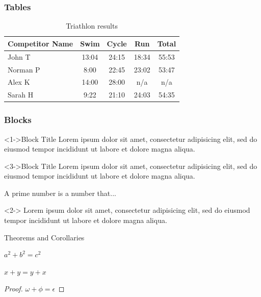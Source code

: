 \documentclass{beamer}
\begin{document}
\begin{frame}
	\frametitle{Tables}
	\begin{table}
		\centering
		\begin{tabular}{l | c | c | c | c }
			Competitor Name & Swim & Cycle & Run & Total \\
			\hline \hline
			John T & 13:04 & 24:15 & 18:34 & 55:53 \\ 
			Norman P & 8:00 & 22:45 & 23:02 & 53:47\\
			Alex K & 14:00 & 28:00 & n/a & n/a\\
			Sarah H & 9:22 & 21:10 & 24:03 & 54:35 
		\end{tabular}
		\caption{Triathlon results}
	\end{table}
	
\end{frame}

\begin{frame}
	\frametitle{Blocks}
	\begin{block}<1->{Block Title}
		Lorem ipsum dolor sit amet, consectetur adipisicing elit, 
		sed do eiusmod tempor incididunt ut labore et 
		dolore magna aliqua.
	\end{block}
	\begin{alertblock}<3->{Block Title}
		Lorem ipsum dolor sit amet, consectetur adipisicing elit, 
		sed do eiusmod tempor incididunt ut labore et 
		dolore magna aliqua.
	\end{alertblock}
	\begin{definition}
		A prime number is a number that...
	\end{definition}
	\begin{example}<2->
		Lorem ipsum dolor sit amet, consectetur adipisicing elit, 
		sed do eiusmod tempor incididunt ut labore et
		dolore magna aliqua.
	\end{example}
\end{frame}


\begin{frame}{Theorems and Corollaries}

\begin{theorem}[Pythagoras] 
	$ a^2 + b^2 = c^2$
\end{theorem}
\begin{corollary}
	$ x + y = y + x  $
\end{corollary}
\begin{proof}
	$\omega +\phi = \epsilon $
\end{proof}
\end{frame}
\end{document}
